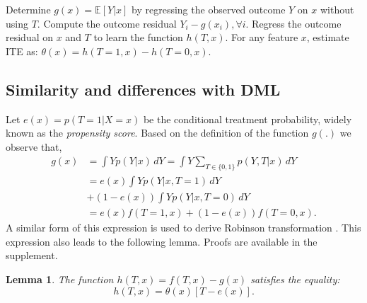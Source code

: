 \documentclass[sigconf]{acmart}
\newcommand{\eat}[1]{}
\theoremstyle{plain}
\newtheorem{lemma}[theorem]{Lemma}
\numberwithin{equation}{section}
\begin{document}
\begin{algorithm}[t]%
 \caption{CDNN algorithm for estimating ITE}
 \label{algo:CDNN}
\begin{algorithmic}[1]
\State Determine $g(x) = \mathbb{E}\left[Y | x\right]$ by regressing the observed outcome $Y$ on $x$ without using $T$.
\State Compute the outcome residual $Y_i-g(x_i), \forall i$.
\State Regress the outcome residual on $x$ and $T$ to learn the function $h(T,x)$.
\State For any feature $x$, estimate ITE as: $\theta(x) = h(T=1,x) - h(T=0,x)$.
\end{algorithmic}
\end{algorithm}

\subsection{Similarity and differences with DML}
\label{subsec:DML}
Let $e(x) = p\left(T=1 | X=x\right)$ be the conditional treatment probability, widely known as the \emph{propensity score}. Based on the definition of the function $g(.)$ we observe that,
\begin{align}
g(x) &= \int Y p(Y|x) \, dY = \int Y \sum\limits_{T \in \{0,1\}} p(Y,T|x) \, dY \nonumber \\
&= e(x) \int Y p(Y|x,T=1) \,dY \nonumber \\
&+ \left(1-e(x)\right)  \int Y p(Y|x,T=0) \,dY \nonumber \\
\label{eq:g}
&=e(x) f(T=1, x) + \left(1-e(x)\right)  f(T=0, x).
\end{align}
A similar form of this expression is used to derive Robinson transformation \cite{RobinsonTransformation}. This expression also leads to the following lemma. Proofs are available in the supplement.
\begin{lemma}
\label{lemma:hthetaconnection}
The function $h(T,x) = f(T,x)-g(x)$ satisfies the equality:
\begin{equation}
\label{eq:hthetae}
h(T,x) = \theta(x) \left[T-e(x)\right].
\end{equation}
\end{lemma}
\eat{
\begin{proof}
Substituting the definition of $h(T,x)$ from eq.~(\ref{eq:f}) in eq.(\ref{eq:g}), we find
\begin{align}
g(x) &= e(x) \left[h(T=1,x)+g(x)\right] + \left(1-e(x)\right) \left[h(T=0, x)+ g(x)\right], \nonumber \\
\label{eq:eheq0}
\implies &e(x) \left[h(T=1,x) - h(T=0,x)\right] + h(T=0,x) = 0.
\end{align}
Plugging the identity $\theta(x) = h(T=1, x) - h(T=0, x)$ in eq.(\ref{eq:eheq0}), we get $h(T=0,x) = \theta(x) \left[0-e(x)\right]$ and $h(T=1,x) = \theta(x) \left[1-e(x)\right]$  and the proof follows.
\end{proof}
}
\end{document}
